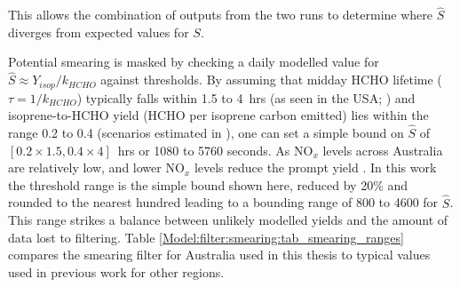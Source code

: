 \documentclass[acp, manuscript]{copernicus}
\newcommand{\parencite}{\citep}
\newcommand{\textcite}{\citet}
\begin{document}
    This allows the combination of outputs from the two runs to determine where $\hat{S}$ diverges from expected values for $S$.
    
    Potential smearing is masked by checking a daily modelled value for $\hat{S} \approx Y_{isop}/k_{HCHO}$ against thresholds.
    By assuming that midday HCHO lifetime ($\tau = 1/k_{HCHO}$) typically falls within 1.5 to 4~hrs (as seen in the USA; \textcite[e.g.,][]{Palmer2006,Wolfe2016}) and isoprene-to-HCHO yield (HCHO per isoprene carbon emitted) lies within the range 0.2 to 0.4 (scenarios estimated in \textcite{Palmer2003}), one can set a simple bound on $\hat{S}$ of $[0.2 \times 1.5, 0.4 \times 4]$~hrs or 1080 to 5760 seconds.
    As NO$_x$ levels across Australia are relatively low, and lower NO$_x$ levels reduce the prompt yield \parencite{Palmer2003,Wolfe2016}.
    In this work the threshold range is the simple bound shown here, reduced by 20\% and rounded to the nearest hundred leading to a bounding range of 800 to 4600 for $\hat{S}$. 
    This range strikes a balance between unlikely modelled yields and the amount of data lost to filtering.
    Table \ref{Model:filter:smearing:tab_smearing_ranges} compares the smearing filter for Australia used in this thesis to typical values used in previous work for other regions.
    
\end{document}
